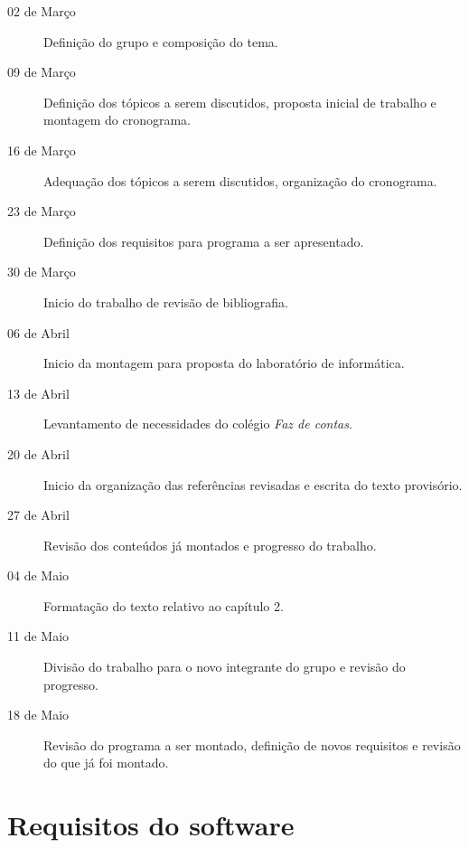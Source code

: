 \documentclass[a4paper,12pt]{report}
\begin{document}
    \begin{description}

        \item[02 de Março] Definição do grupo e composição do tema.

        \item[09 de Março] Definição dos tópicos a serem discutidos, proposta
        inicial de trabalho e montagem do cronograma.

        \item[16 de Março] Adequação dos tópicos a serem discutidos, organização
        do cronograma.

        \item[23 de Março] Definição dos requisitos para programa a ser
        apresentado.

        \item[30 de Março] Inicio do trabalho de revisão de bibliografia.

        \item[06 de Abril] Inicio da montagem para proposta do laboratório de
        informática.

        \item[13 de Abril] Levantamento de necessidades do colégio \emph{Faz de
        contas}.

        \item[20 de Abril] Inicio da organização das referências revisadas e
        escrita do texto provisório.

        \item[27 de Abril] Revisão dos conteúdos já montados e progresso do
        trabalho.

        \item[04 de Maio] Formatação do texto relativo ao capítulo 2.

        \item[11 de Maio] Divisão do trabalho para o novo integrante do grupo e
        revisão do progresso.

        \item[18 de Maio] Revisão do programa a ser montado, definição de novos
        requisitos e revisão do que já foi montado.

    \end{description}

    \chapter{Requisitos do software}
\end{document}
